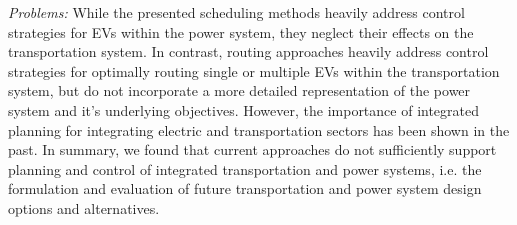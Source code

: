
\textit{Problems:} While the presented scheduling methods heavily address control strategies for EVs within the power system, they neglect their effects on the transportation system. In contrast, routing approaches heavily address control strategies for optimally routing single or multiple EVs within the transportation system, but do not incorporate a more detailed representation of the power system and it's underlying objectives. However, the importance of integrated planning for integrating electric and transportation sectors \cite{mathiesen2008integrated} has been shown in the past. In summary, we found that current approaches do not sufficiently support planning and control of integrated transportation and power systems, i.e. the formulation and evaluation of future transportation and power system design options and alternatives.






